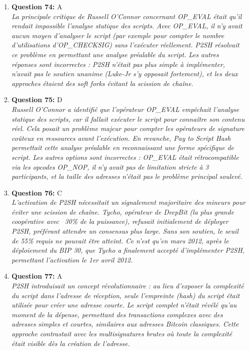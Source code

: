 \documentclass[12pt,a4paper]{article}
\begin{document}
\begin{enumerate}
\item \textbf{Question 74:} A
\\ \textit{La principale critique de Russell O'Connor concernant OP_EVAL était qu'il rendait impossible l'analyse statique des scripts. Avec OP_EVAL, il n'y avait aucun moyen d'analyser le script (par exemple pour compter le nombre d'utilisations d'OP_CHECKSIG) sans l'exécuter réellement. P2SH résolvait ce problème en permettant une analyse préalable du script. Les autres réponses sont incorrectes : P2SH n'était pas plus simple à implémenter, n'avait pas le soutien unanime (Luke-Jr s'y opposait fortement), et les deux approches étaient des soft forks évitant la scission de chaîne.}

\item \textbf{Question 75:} D
\\ \textit{Russell O'Connor a identifié que l'opérateur OP_EVAL empêchait l'analyse statique des scripts, car il fallait exécuter le script pour connaître son contenu réel. Cela posait un problème majeur pour compter les opérateurs de signature coûteux en ressources avant l'exécution. En revanche, Pay to Script Hash permettait cette analyse préalable en reconnaissant une forme spécifique de script. Les autres options sont incorrectes : OP_EVAL était rétrocompatible via les opcodes OP_NOP, il n'y avait pas de limitation stricte à 3 participants, et la taille des adresses n'était pas le problème principal soulevé.}

\item \textbf{Question 76:} C
\\ \textit{L'activation de P2SH nécessitait un signalement majoritaire des mineurs pour éviter une scission de chaîne. Tycho, opérateur de DeepBit (la plus grande coopérative avec ~30\% de la puissance), refusait initialement de déployer P2SH, préférant attendre un consensus plus large. Sans son soutien, le seuil de 55\% requis ne pouvait être atteint. Ce n'est qu'en mars 2012, après le déploiement du BIP 30, que Tycho a finalement accepté d'implémenter P2SH, permettant l'activation le 1er avril 2012.}

\item \textbf{Question 77:} A
\\ \textit{P2SH introduisait un concept révolutionnaire : au lieu d'exposer la complexité du script dans l'adresse de réception, seule l'empreinte (hash) du script était utilisée pour créer une adresse courte. Le script complet n'était révélé qu'au moment de la dépense, permettant des transactions complexes avec des adresses simples et courtes, similaires aux adresses Bitcoin classiques. Cette approche contrastait avec les multisignatures brutes où toute la complexité était visible dès la création de l'adresse.}


\end{enumerate}
\end{document}
